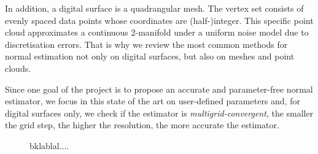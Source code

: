 In addition, a digital surface is a quadrangular mesh. The vertex set consists of evenly spaced data points
whose coordinates are (half-)integer. This specific point cloud approximates a continuous 2-manifold under a
uniform noise model due to discretisation errors. That is why we review the most common methods for normal estimation
not only on digital surfaces, but also on meshes and point clouds.


Since one goal of the project is to propose an accurate and parameter-free normal estimator,
we focus in this state of the art on user-defined parameters and, for digital surfaces only,
we check if the estimator is \emph{multigrid-convergent}, \ie the smaller the grid step,
the higher the resolution, the more accurate the estimator. 

\begin{figure}[htbp]
  \centering
  \caption{bklablal....}
  \label{fig:multi}
\end{figure}





